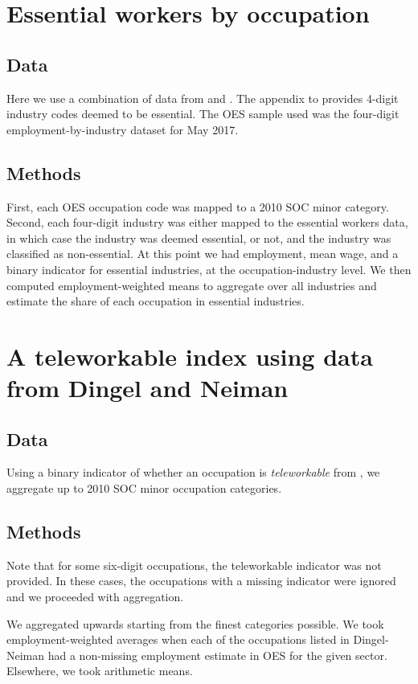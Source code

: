 \documentclass{article}
\begin{document}
\section{Essential workers by occupation}
\subsection{Data}
Here we use a combination of data from \cite{OES} and \cite{brookings}. The appendix to \cite{brookings} provides 4-digit industry codes deemed to be essential. The OES sample used was the four-digit employment-by-industry dataset for May 2017.

\subsection{Methods}
First, each OES occupation code was mapped to a 2010 SOC minor category. Second, each four-digit industry was either mapped to the essential workers data, in which case the industry was deemed essential, or not, and the industry was classified as non-essential.
At this point we had employment, mean wage, and a binary indicator for essential industries, at the occupation-industry level. We then computed employment-weighted means to aggregate over all industries and estimate the share of each occupation in essential industries.

\section{A teleworkable index using data from Dingel and Neiman}

\subsection{Data}
Using a binary indicator of whether an occupation is \emph{teleworkable} from \cite{DN}, we aggregate up to 2010 SOC minor occupation categories.

\subsection{Methods}
Note that for some six-digit occupations, the teleworkable indicator was not provided. In these cases, the occupations with a missing indicator were ignored and we proceeded with aggregation.

We aggregated upwards starting from the finest categories possible. We took employment-weighted averages when each of the occupations listed in Dingel-Neiman had a non-missing employment estimate in OES for the given sector. Elsewhere, we took arithmetic means. 
\end{document}
